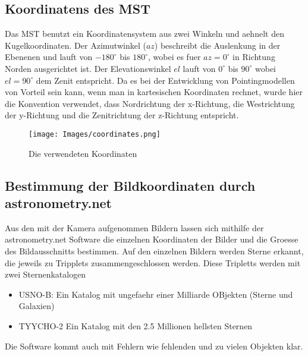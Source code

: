 \subsection{Koordinatens des MST}
Das MST benutzt ein Koordinatensystem aus zwei Winkeln und aehnelt den Kugelkoordinaten. Der Azimutwinkel ($az$) beschreibt die Auslenkung in der Ebenenen und lauft von $-180^{\circ}$ bis $180^{\circ}$, wobei es fuer $az=0^{\circ}$ in Richtung Norden ausgerichtet ist. Der Elevationswinkel $el$ lauft von $0^{\circ}$ bis $90^{\circ}$ wobei $el=90^{\circ}$ dem Zenit entspricht. Da es bei der Entwicklung von Pointingmodellen von Vorteil sein kann, wenn man in kartesischen Koordinaten rechnet, wurde hier die Konvention verwendet, dass Nordrichtung der x-Richtung, die Westrichtung der y-Richtung und die Zenitrichtung der z-Richtung entspricht.
\begin{figure}[htbp]
\centering
\texttt{[image: Images/coordinates.png]}
\caption{Die verwendeten Koordinaten}
\label{img:coordinates}
\end{figure}
\subsection{Bestimmung der Bildkoordinaten durch astronometry.net}
Aus den mit der Kamera aufgenommen Bildern lassen sich mithilfe der astronometry.net Software die einzelnen Koordinaten der Bilder und die Groesse des Bildausschnitts bestimmen. Auf den einzelnen Bildern werden Sterne erkannt, die jeweils zu Tripplets zusammengeschlossen werden. Diese Tripletts werden mit zwei Sternenkatalogen 
\begin{itemize}
\item USNO-B: Ein Katalog mit ungefaehr einer Milliarde OBjekten (Sterne und Galaxien)
\item TYYCHO-2 Ein Katalog mit den 2.5 Millionen hellsten Sternen
\end{itemize}
Die Software kommt auch mit Fehlern wie fehlenden und zu vielen Objekten klar.
